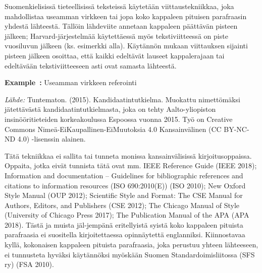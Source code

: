 \documentclass[finnish, 12pt, a4paper, elec, utf8, a-2b, online]{aaltothesis}
\begin{document}
Suomenkielisissä tieteellisissä teksteissä käytetään viittaustekniikkaa, joka 
mahdollistaa useamman virkkeen tai jopa koko kappaleen pituisen parafraasin 
yhdestä lähteestä. Tällöin lähdeviite annetaan kappaleen päättävän pisteen 
jälkeen; Harvard-järjestelmää käytettäessä myös tekstiviitteessä on piste 
vuosiluvun jälkeen (ks. esimerkki alla). Käytännön mukaan viittauksen sijainti 
pisteen jälkeen osoittaa, että kaikki edeltävät lauseet kappalerajaan tai 
edeltävään tekstiviitteeseen asti ovat samasta lähteestä.

\vspace{1em}
\noindent
{}
\textsf{\textbf{Example~\theexample:}} \label{ex:Finn} Useamman virkkeen 
referointi

\vspace{1ex}
\noindent
{}

\vspace{1ex}
\noindent
\textit{Lähde:} Tuntematon. (2015). Kandidaatintutkielma. Muokattu nimettömäksi 
jätettävästä kandidaatintutkielmasta, joka on tehty Aalto-yliopiston 
insinööritieteiden korkeakoulussa Espoossa vuonna 2015. Työ on Creative Commons 
Nimeä-EiKaupallinen-EiMuutoksia 4.0 Kansainvälinen (CC BY-NC-ND 4.0) -lisenssin 
alainen.

Tätä tekniikkaa ei sallita tai tunneta monissa kansainvälisissä 
kirjoitusoppaissa. Oppaita, jotka eivät tunnista tätä ovat mm. IEEE Reference 
Guide (IEEE 2018); Information and documentation – Guidelines for bibliographic 
references and citations to information resources (ISO 690:2010(E)) (ISO 2010); 
New Oxford Style Manual (OUP 2012); Scientific Style and Format: The CSE Manual 
for Authors, Editors, and Publishers (CSE 2012); The Chicago Manual of Style 
(University of Chicago Press 2017); The Publication Manual of the APA (APA 
2018). Tästä ja muista jäl-jempänä eritellyistä syistä koko kappaleen pituista 
parafraasia ei suositella kirjoitettaessa opinnäytettä englanniksi. Kiinnostavaa 
kyllä, kokonaisen kappaleen pituista parafraasia, joka perustuu yhteen 
lähteeseen, ei tunnusteta hyväksi käytännöksi myöskään Suomen 
Standardoimisliitossa (SFS ry) (FSA 2010).
\end{document}
